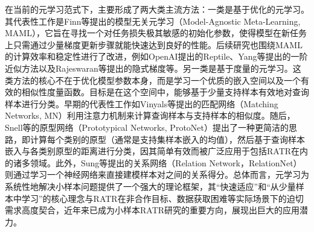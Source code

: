 在当前的元学习范式下，主要形成了两大类主流方法：一类是基于优化的元学习。其代表性工作是Finn等提出的模型无关元学习（Model-Agnostic Meta-Learning, MAML），它旨在寻找一个对任务损失极其敏感的初始化参数，使得模型在新任务上只需通过少量梯度更新步骤就能快速达到良好的性能。后续研究也围绕MAML的计算效率和稳定性进行了改进，例如OpenAI提出的Reptile、Yang等提出的一阶近似方法以及Rajeswaran等提出的隐式梯度等。另一类是基于度量的元学习。这类方法的核心不在于优化模型参数本身，而是学习一个优质的嵌入空间以及一个有效的相似性度量函数。目标是在这个空间中，能够基于少量支持样本有效地对查询样本进行分类。早期的代表性工作如Vinyals等提出的匹配网络（Matching Networks, MN）利用注意力机制来计算查询样本与支持样本的相似度。随后，Snell等的原型网络（Prototypical Networks, ProtoNet）提出了一种更简洁的思路，即计算每个类别的原型（通常是支持集样本嵌入的均值），然后基于查询样本嵌入与各类别原型的距离进行分类，因其简单有效而被广泛应用于包括RATR在内的诸多领域。此外，Sung等提出的关系网络（Relation Network，RelationNet）则通过学习一个神经网络来直接建模样本对之间的关系得分。总体而言，元学习为系统性地解决小样本问题提供了一个强大的理论框架，其“快速适应”和“从少量样本中学习”的核心理念与RATR在非合作目标、数据获取困难等实际场景下的迫切需求高度契合，近年来已成为小样本RATR研究的重要方向，展现出巨大的应用潜力。

